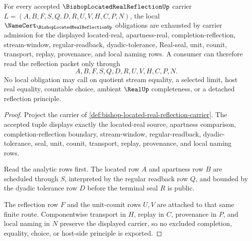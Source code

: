 \begin{theorem}
\label{thm:bishop-located-real-reflection-namecert-obligations}
For every accepted $\BishopLocatedRealReflectionUp$ carrier $L=(A,B,F,S,Q,D,R,U,V,H,C,P,N)$, the local $\NameCert_{\BishopLocatedRealReflectionUp}$ obligations are exhausted by carrier admission for the displayed located-real, apartness-real, completion-reflection, stream-window, regular-readback, dyadic-tolerance, Real-seal, unit, counit, transport, replay, provenance, and local naming rows. A consumer can therefore read the reflection packet only through
$$
A,B,F,S,Q,D,R,U,V,H,C,P,N .
$$
No local obligation may call on quotient stream equality, a selected limit, host real equality, countable choice, ambient $\RealUp$ completeness, or a detached reflection principle.
\end{theorem}
\begin{proof}
Project the carrier of \autoref{def:bishop-located-real-reflection-carrier}. The accepted tuple displays exactly the located-real source, apartness comparison, completion-reflection boundary, stream-window, regular-readback, dyadic-tolerance, seal, unit, counit, transport, replay, provenance, and local naming rows.

Read the analytic rows first. The located row $A$ and apartness row $B$ are scheduled through $S$, interpreted by the regular readback row $Q$, and bounded by the dyadic tolerance row $D$ before the terminal seal $R$ is public.

The reflection row $F$ and the unit-counit rows $U,V$ are attached to that same finite route. Componentwise transport in $H$, replay in $C$, provenance in $P$, and local naming in $N$ preserve the displayed carrier, so no excluded completion, equality, choice, or host-side principle is exported.
\end{proof}

